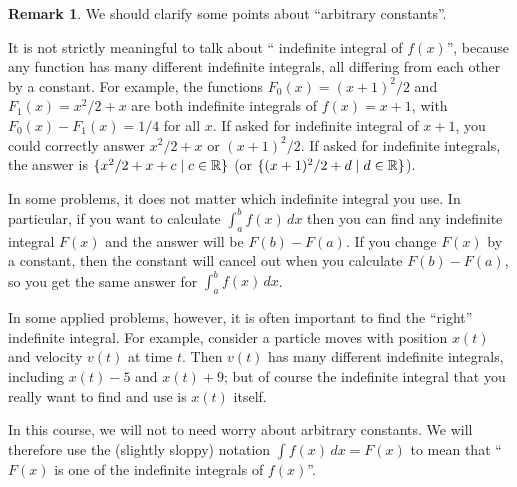 \documentclass[a4paper]{book}
\theoremstyle{definition}
\newtheorem{remark}[theorem]{Remark}
\begin{document}
\begin{remark}
 We should clarify some points about ``arbitrary constants''.

 It is not strictly meaningful to talk about `` indefinite
 integral of $f(x)$'', because any function has many different
 indefinite integrals, all differing from each other by a constant.
 For example, the functions $F_0(x)=(x+1)^2/2$ and $F_1(x)=x^2/2+x$
 are both indefinite integrals of $f(x)=x+1$, with
 $F_0(x)-F_1(x)=1/4$ for all $x$.  If asked for  indefinite
 integral of $x+1$, you could correctly answer $x^2/2+x$ or
 $(x+1)^2/2$.  If asked for  indefinite integrals, the
 answer is $\{x^2/2+x+c\;|\; c\in{\mathbb{R}}\}$ (or
 $\{(x+1)^2/2+d\;|\; d\in{\mathbb{R}}\}$).
 
 In some problems, it does not matter which indefinite integral you
 use.  In particular, if you want to calculate $\int_a^bf(x)\,dx$ then
 you can find any indefinite integral $F(x)$ and the answer will be
 $F(b)-F(a)$.  If you change $F(x)$ by a constant, then the constant
 will cancel out when you calculate $F(b)-F(a)$, so you get the same
 answer for $\int_a^bf(x)\,dx$.

 In some applied problems, however, it is often important to find the
 ``right'' indefinite integral.  For example, consider a particle
 moves with position $x(t)$ and velocity $v(t)$ at time $t$.  Then
 $v(t)$ has many different indefinite integrals, including $x(t)-5$
 and $x(t)+9$; but of course the indefinite integral that you really
 want to find and use is $x(t)$ itself.
 
 In this course, we will not to need worry about arbitrary constants.
 We will therefore use the (slightly sloppy) notation
  $\int f(x)\,dx=F(x)$ to mean that ``$F(x)$ is one of the indefinite
 integrals of $f(x)$''.
\end{remark}
\end{document}
